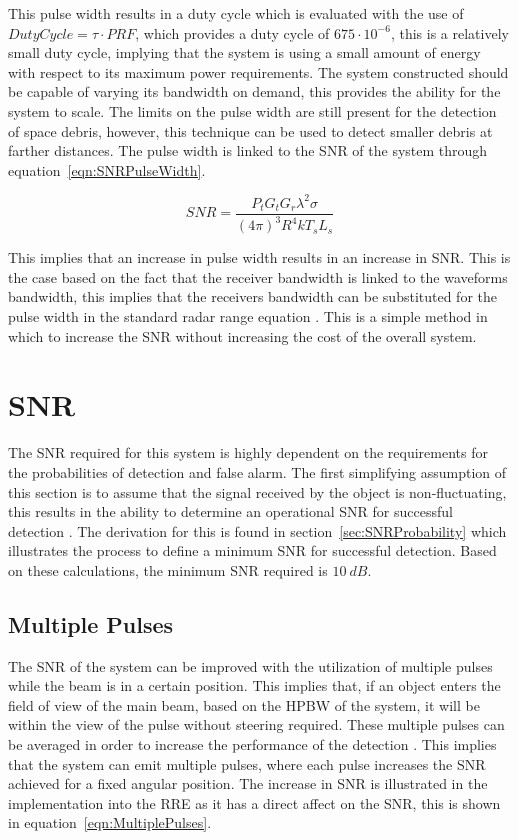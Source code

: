\documentclass[11pt]{witseiepaper}
\begin{document}
\begin{bibunit}[witseie]
This pulse width results in a duty cycle which is evaluated with the use of $Duty Cycle = \tau \cdot PRF$, which provides a duty cycle of $675 \cdot 10^{-6}$, this is a relatively small duty cycle, implying that the system is using a small amount of energy with respect to its maximum power requirements.
The system constructed should be capable of varying its bandwidth on demand, this provides the ability for the system to scale. The limits on the pulse width are still present for the detection of space debris, however, this technique can be used to detect smaller debris at farther distances.
The pulse width is linked to the SNR of the system through equation~\ref{eqn:SNRPulseWidth}.

\begin{equation} \label{eqn:SNRPulseWidth}
SNR = \frac{P_{t} G_t G_r {\lambda^2} \sigma}{(4 \pi )^3 R^4 k T_s L_s}
\end{equation}

This implies that an increase in pulse width results in an increase in SNR. This is the case based on the fact that the receiver bandwidth is linked to the waveforms bandwidth, this implies that the receivers bandwidth can be substituted for the pulse width in the standard radar range equation \cite[p.~776]{radarHandbook}.
This is a simple method in which to increase the SNR without increasing the cost of the overall system.

\section{SNR} \label{sec:SNR}
The SNR required for this system is highly dependent on the requirements for the probabilities of detection and false alarm. The first simplifying assumption of this section is to assume that the signal received by the object is non-fluctuating, this results in the ability to determine an operational SNR for successful detection \cite[p.~102-103]{radarHandbook}.
The derivation for this is found in section~\ref{sec:SNRProbability} which illustrates the process to define a minimum SNR for successful detection. Based on these calculations, the minimum SNR required is $10~dB$.

\subsection{Multiple Pulses} \label{sec:MultiplePulses}
The SNR of the system can be improved with the utilization of multiple pulses while the beam is in a certain position. This implies that, if an object enters the field of view of the main beam, based on the HPBW of the system, it will be within the view of the pulse without steering required.
These multiple pulses can be averaged in order to increase the performance of the detection \cite[p.~66]{radarHandbook}. This implies that the system can emit multiple pulses, where each pulse increases the SNR achieved for a fixed angular position.
The increase in SNR is illustrated in the implementation into the RRE as it has a direct affect on the SNR, this is shown in equation~\ref{eqn:MultiplePulses}.


\end{bibunit}
\end{document}
